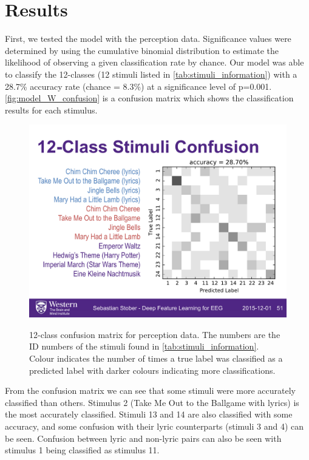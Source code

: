 \section{Results}
First, we tested the model with the perception data. 
Significance values were determined by using the cumulative binomial distribution to estimate the likelihood of observing a given classification rate by chance. 
Our model was able to classify the 12-classes (12 stimuli listed in \autoref{tab:stimuli_information}) with a 28.7\% accuracy rate (chance = 8.3\%) at a significance level of p=0.001. 
\autoref{fig:model_W_confusion} is a confusion matrix which shows the classification results for each stimulus.
\begin{figure}[htb] 
  \begin{center}
    \includegraphics[width=.75\textwidth,keepaspectratio=true]{Figures/model_W_confusion}
   \\\vspace{-0.8em}
    \caption{12-class confusion matrix for perception data. The numbers are the ID numbers of the stimuli found in \autoref{tab:stimuli_information}. Colour indicates the number of times a true label was classified as a predicted label with darker colours indicating more classifications.}
    \label{fig:model_W_confusion}
  \end{center}
\end{figure}
From the confusion matrix we can see that some stimuli were more accurately classified than others. 
Stimulus 2 (Take Me Out to the Ballgame with lyrics) is the most accurately classified. 
Stimuli 13 and 14 are also classified with some accuracy, and some confusion with their lyric counterparts (stimuli 3 and 4) can be seen.
Confusion between lyric and non-lyric pairs can also be seen with stimulus 1 being classified as stimulus 11.

